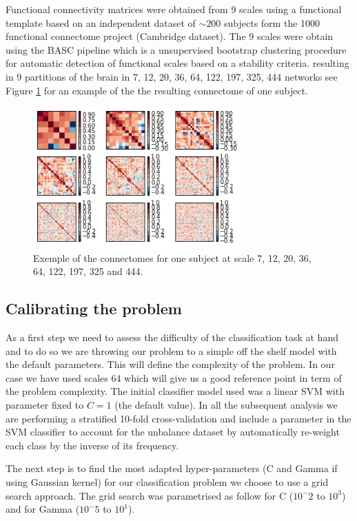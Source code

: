 \documentclass[12pt,journal,compsoc]{IEEEtran}
\begin{document}
Functional connectivity matrices were obtained from 9 scales using a functional template based on an independent dataset of $\sim 200$ subjects form the 1000 functional connectome project (Cambridge dataset). The 9 scales were obtain using the BASC pipeline \cite{Bellec2010a} which is a unsupervised bootstrap clustering procedure for automatic detection of functional scales based on a stability criteria. resulting in 9 partitions of the brain in 7, 12, 20, 36, 64, 122, 197, 325, 444 networks see Figure \ref{fig_connectomes3x3} for an example of the the resulting connectome of one subject.

\begin{figure}[h]
\centering
\includegraphics[width=8cm]{connectome3x3.png}
\caption{Exemple of the connectomes for one subject at scale 7, 12, 20, 36, 64, 122, 197, 325 and 444.}
\label{fig_connectomes3x3}
\end{figure}

\subsection{Calibrating the problem}

As a first step we need to assess the difficulty of the classification task at hand and to do so we are throwing our problem to a simple off the shelf model with the default parameters. This will define the complexity of the problem. In our case we have used scales 64 which will give us a good reference point in term of the problem complexity. The initial classifier model used was a linear SVM with parameter fixed to $C=1$ (the default value). In all the subsequent analysis we are performing a stratified 10-fold cross-validation and include a parameter in the SVM classifier to account for the unbalance dataset by automatically re-weight each class by the inverse of its frequency.

The next step is to find the most adapted hyper-parameters (C and Gamma if using Gaussian kernel) for our classification problem we choose to use a grid search approach. The grid search was parametrised as follow for C ($10^-2$ to $10^3$) and for Gamma ($10^-5$ to $10^1$).
\end{document}
